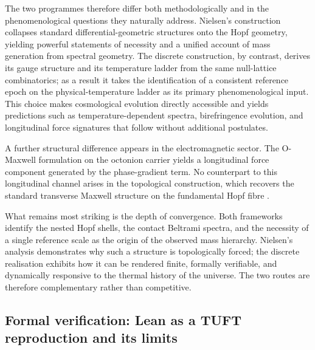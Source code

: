 \documentclass[11pt]{amsart}
\begin{document}
The two programmes therefore differ both methodologically and in the phenomenological questions they naturally address. Nielsen's construction collapses standard differential-geometric structures onto the Hopf geometry, yielding powerful statements of necessity and a unified account of mass generation from spectral geometry. The discrete construction, by contrast, derives its gauge structure and its temperature ladder from the same null-lattice combinatorics; as a result it takes the identification of a consistent reference epoch on the physical-temperature ladder as its primary phenomenological input. This choice makes cosmological evolution directly accessible and yields predictions such as temperature-dependent spectra, birefringence evolution, and longitudinal force signatures that follow without additional postulates.

A further structural difference appears in the electromagnetic sector. The O-Maxwell formulation on the octonion carrier yields a longitudinal force component generated by the phase-gradient term. No counterpart to this longitudinal channel arises in the topological construction, which recovers the standard transverse Maxwell structure on the fundamental Hopf fibre \cite{maxwell1865,jackson1999}.

What remains most striking is the depth of convergence. Both frameworks identify the nested Hopf shells, the contact Beltrami spectra, and the necessity of a single reference scale as the origin of the observed mass hierarchy. Nielsen's analysis demonstrates why such a structure is topologically forced; the discrete realisation exhibits how it can be rendered finite, formally verifiable, and dynamically responsive to the thermal history of the universe. The two routes are therefore complementary rather than competitive.

\subsection{Formal verification: Lean as a TUFT reproduction and its limits}
\label{sec:lean-tuft-reproduction}
\end{document}
